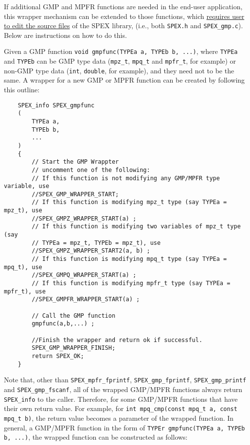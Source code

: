 \documentclass[12pt]{report}
\theoremstyle{definition}
\begin{document}
If additional GMP and MPFR functions are needed in the end-user application,
this wrapper mechanism can be extended to those functions, which \ul{requires user to edit the source files} of the SPEX library, (i.e., both \verb|SPEX.h| and \verb|SPEX_gmp.c|).  Below are
instructions on how to do this.

Given a GMP function \verb|void gmpfunc(TYPEa a, TYPEb b, ...)|, where
\verb|TYPEa| and \verb|TYPEb| can be GMP type data (\verb|mpz_t|,
\verb|mpq_t| and \verb|mpfr_t|, for example) or non-GMP type data (\verb|int|,
\verb|double|, for example), and they need not to be the same.
A wrapper for a new GMP or MPFR function can be created by following
this outline:

\begin{mdframed}[userdefinedwidth=6in]
{\footnotesize
\begin{verbatim}
    SPEX_info SPEX_gmpfunc
    (
        TYPEa a,
        TYPEb b,
        ...
    )
    {
        // Start the GMP Wrappter
        // uncomment one of the following:
        // If this function is not modifying any GMP/MPFR type variable, use
        //SPEX_GMP_WRAPPER_START;
        // If this function is modifying mpz_t type (say TYPEa = mpz_t), use
        //SPEX_GMPZ_WRAPPER_START(a) ;
        // If this function is modifying two variables of mpz_t type (say
        // TYPEa = mpz_t, TYPEb = mpz_t), use
        //SPEX_GMPZ_WRAPPER_START2(a, b) ;
        // If this function is modifying mpq_t type (say TYPEa = mpq_t), use
        //SPEX_GMPQ_WRAPPER_START(a) ;
        // If this function is modifying mpfr_t type (say TYPEa = mpfr_t), use
        //SPEX_GMPFR_WRAPPER_START(a) ;
    
        // Call the GMP function
        gmpfunc(a,b,...) ;
    
        //Finish the wrapper and return ok if successful.
        SPEX_GMP_WRAPPER_FINISH;
        return SPEX_OK;
    }
\end{verbatim}
} \end{mdframed}

Note that, other than \verb|SPEX_mpfr_fprintf|, \verb|SPEX_gmp_fprintf|,
\verb|SPEX_gmp_printf| and \verb|SPEX_gmp_fscanf|, all of the wrapped GMP/MPFR
functions always return \verb|SPEX_info| to the caller. Therefore, for some
GMP/MPFR functions that have their own return value.  For example, for
\verb|int mpq_cmp(const mpq_t a, const mpq_t b)|, the return value becomes a
parameter of the wrapped function. In general, a GMP/MPFR function in the form
of \verb|TYPEr gmpfunc(TYPEa a, TYPEb b, ...)|, the wrapped
function can be constructed as follows:
\end{document}
